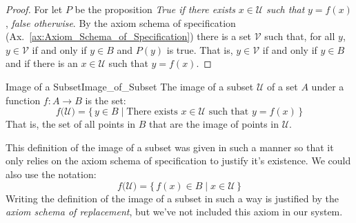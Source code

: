         \begin{proof}
            For let $P$ be the proposition \textit{True if there exists}
            $x\in\mathcal{U}$ \textit{such that} $y=f(x)$,
            \textit{false otherwise}. By the axiom schema of specification
            (Ax.~\ref{ax:Axiom_Schema_of_Specification}) there is a set
            $\mathcal{V}$ such that, for all $y$, $y\in\mathcal{V}$ if and
            only if $y\in{B}$ and $P(y)$ is true. That is, $y\in\mathcal{V}$
            if and only if $y\in{B}$ and if there is an $x\in\mathcal{U}$ such
            that $y=f(x)$.
        \end{proof}
        \begin{fdefinition}{Image of a Subset}{Image_of_Subset}
            The image of a subset $\mathcal{U}$ of a set $A$ under a function
            $f:A\rightarrow{B}$ is the set:
            \begin{equation}
                f\big(\mathcal{U}\big)=
                    \{\,y\in{B}\;|\;\textrm{There exists }x\in\mathcal{U}
                                    \textrm{ such that }y=f(x)\,\}
            \end{equation}
            That is, the set of all points in $B$ that are the
            image of points in $\mathcal{U}$.
        \end{fdefinition}
        This definition of the image of a subset was given in such a manner
        so that it only relies on the axiom schema of specification to
        justify it's existence. We could also use the notation:
        \begin{equation}
            f\big(\mathcal{U})=\{\,f(x)\in{B}\;|\;x\in\mathcal{U}\,\}
        \end{equation}
        Writing the definition of the image of a subset in such a way is
        justified by the \textit{axiom schema of replacement}, but we've not
        included this axiom in our system.
